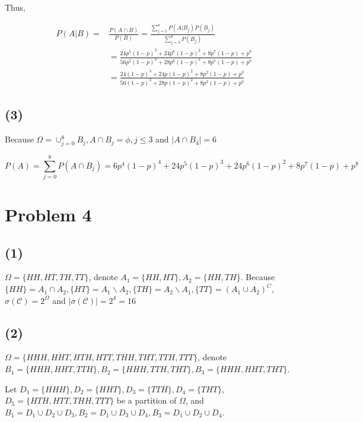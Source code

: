 \documentclass{article}
\begin{document}
Thus,

\begin{equation}
    \begin{aligned}
        P(A|B) =& \frac {P(A\cap B)} {P(B)} = \frac{\sum_{j=5}^8{P(A|B_j)}P(B_j)}{\sum_{j=5}^8 P(B_j)} \\ 
        & = \frac{24p^5(1-p)^3+24p^6(1-p)^2+8p^7(1-p)+p^8}{56p^5(1-p)^3+28p^6(1-p)^2+8p^7(1-p)+p^8} \\
        & = \frac{24(1-p)^3+24p(1-p)^2+8p^2(1-p)+p^3}{56(1-p)^3+28p(1-p)^2+8p^2(1-p)+p^3}
    \end{aligned}
\end{equation}

\subsection{(3)}

Because $\Omega = \cup_{j=0}^8 B_j,A\cap B_j = \phi, j\leqslant 3$ and $|A \cap B_4| = 6$

\begin{equation}
    P(A) = \sum_{j=0}^8 P(A\cap B_j)= 6p^4(1-p)^4+ 24p^5(1-p)^3+24p^6(1-p)^2+8p^7(1-p)+p^8
\end{equation}

\section{Problem 4}

\subsection{(1)}

$\Omega = \{HH,HT,TH,TT\}$, denote $A_1 = \{HH,HT\},A_2 = \{HH,TH\}$.
Because $\{HH\}=A_1 \cap A_2,\{HT\} = A_1\backslash A_2,\{TH\} = A_2\backslash A_1,\{TT\} = (A_1\cup A_2)^C$, $\sigma(\mathcal{C}) = 2^{\Omega}$ and $|\sigma(\mathcal{C})| = 2^4 = 16$

\subsection{(2)}

$\Omega = \{HHH,HHT,HTH,HTT,THH,THT,TTH,TTT\}$, denote $B_1 = \{HHH,HHT,TTH\} , B_2=\{ HHH, TTH, THT \} , B_3 = \{ HHH, HHT, THT \}$.

Let $D_1 = \{HHH\},D_2 = \{HHT\},D_3 = \{TTH\},D_4 = \{THT\}$, $D_5 = \{HTH,HTT,THH,TTT\}$ be a partition of $\Omega$, and $B_1 = D_1 \cup D_2 \cup D_3,B_2 = D_1\cup D_3 \cup D_4, B_3 = D_1 \cup D_2\cup D_4$.
\end{document}

